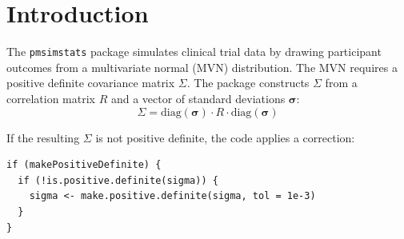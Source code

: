 \documentclass[11pt]{article}
\begin{document}
\maketitle
\thispagestyle{fancy}

\begin{abstract}
The \texttt{pmsimstats} data-generating process constructs a
$26 \times 26$ covariance matrix from user-specified correlation
parameters and passes it to \texttt{MASS::mvrnorm()} to draw
simulated participant data. When the resulting matrix is not
positive definite (PD), the code silently projects it to the
nearest PD matrix via
\texttt{corpcor::make.positive.definite()}. We instrumented the
simulation pipeline to measure the frequency and severity of
these failures across four code versions (commits). The results
reveal that PD failure is not a rare edge case but a routine
feature of the simulation: 24.7\% of matrices fail at the
initial commit, rising to 63.0\% after the Ron Thomas edits.
All 162 matrices in the parameter sweep are ill-conditioned
(condition number $> 100$). The failures are concentrated in the
OL+BDC design (83--92\% failure rate) due to abrupt
expectancy-driven variance changes mid-trial. These findings
indicate that the correlation parameter space used in the
publication is not self-consistent and that the PD correction
introduces an uncontrolled perturbation to the intended
covariance structure.
\end{abstract}

\tableofcontents
\newpage

\section{Introduction}

The \texttt{pmsimstats} package simulates clinical trial data by
drawing participant outcomes from a multivariate normal (MVN)
distribution. The MVN requires a positive definite covariance
matrix $\Sigma$. The package constructs $\Sigma$ from a
correlation matrix $R$ and a vector of standard deviations
$\boldsymbol{\sigma}$:
\[
\Sigma = \text{diag}(\boldsymbol{\sigma})
  \cdot R \cdot
  \text{diag}(\boldsymbol{\sigma})
\]

If the resulting $\Sigma$ is not positive definite, the code
applies a correction:

\begin{verbatim}
if (makePositiveDefinite) {
  if (!is.positive.definite(sigma)) {
    sigma <- make.positive.definite(sigma, tol = 1e-3)
  }
}
\end{verbatim}
\end{document}
